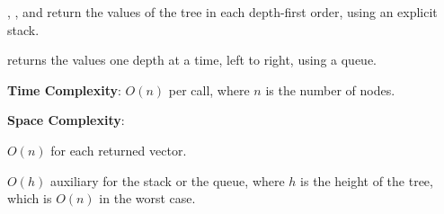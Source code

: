 \begin{compactitem}
  \item {}, , and  return the values of the tree in each depth-first order, using an explicit stack.
  \item {} returns the values one depth at a time, left to right, using a queue.
\end{compactitem}

\textbf{Time Complexity}: $O(n)$ per call, where $n$ is the number of nodes.

\textbf{Space Complexity}:
\begin{compactitem}
  \item $O(n)$ for each returned vector.
  \item $O(h)$ auxiliary for the stack or the queue, where $h$ is the height of the tree, which is $O(n)$ in the worst case.
\end{compactitem}

